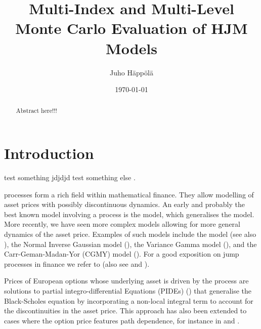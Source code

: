 \documentclass[11pt]{amsart}
\title[MIMC and MLMC HJM]{Multi-Index and Multi-Level Monte Carlo Evaluation of HJM Models}
\author{Juho H\"app\"ol\"a}
\date{\today}
\begin{document}
\begin{abstract}
Abstract here!!!
\end{abstract}

\maketitle


\section{Introduction}
\label{section:Introduction}

test something \cite{haji2015multi} jdjdjd
test something else \cite{bjork2013monte}.

\levy processes form a rich field within mathematical
finance. They allow modelling of asset prices with possibly discontinuous dynamics. An early and probably the best known model involving
a \levy process is
the \cite{Merton1976125} model, which generalises the \cite{black1973pricing} model. More recently, we have seen more complex models allowing
for more general dynamics of the asset price. Examples of such models include
the \cite{kou2002jump} model (see also \cite{Dotsis20073584}), the Normal Inverse Gaussian
model (\cite{barndorff1997normal, rydberg1997normal}),
the Variance Gamma model (\cite{madan1990variance, madan1998variance}),
and the Carr-Geman-Madan-Yor (CGMY) model
(\cite{cgmy_fine,carr2003stochastic}). For a good exposition on jump processes in finance we refer to \cite{conttankov}
(also see \cite{raible2000levy} and \cite{eberlein2001application}).

Prices of European options whose underlying asset is driven
by the \levy process are solutions to partial integro-differential
Equations (PIDEs) (\cite{nualart2001backward,briani_chioma_natalini,almendral2005numerical,kiessling2011diffusion})
that generalise
the Black-Scholes equation by incorporating a
non-local integral term to account for the discontinuities in
the asset price. This approach has also been extended to
cases where the option price features path dependence,
for instance in \cite{boyarchenko2002barrier} \cite{d2004penalty} and \cite{lord2008fast}.
\end{document}
